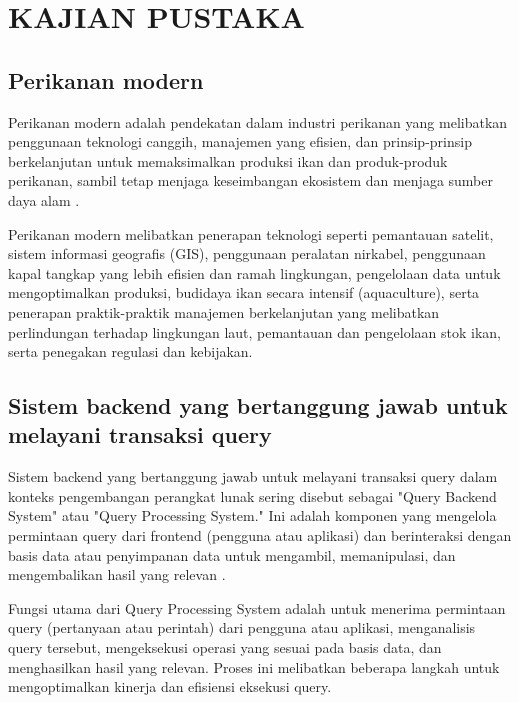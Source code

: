 
\chapter{KAJIAN PUSTAKA} 

\section{Perikanan modern}
Perikanan modern adalah pendekatan dalam industri perikanan yang melibatkan penggunaan teknologi canggih, manajemen yang efisien, dan prinsip-prinsip berkelanjutan untuk memaksimalkan produksi ikan dan produk-produk perikanan, sambil tetap menjaga keseimbangan ekosistem dan menjaga sumber daya alam \citep{kusuma2004sistem}.

Perikanan modern melibatkan penerapan teknologi seperti pemantauan satelit, sistem informasi geografis (GIS), penggunaan peralatan nirkabel, penggunaan kapal tangkap yang lebih efisien dan ramah lingkungan, pengelolaan data untuk mengoptimalkan produksi, budidaya ikan secara intensif (aquaculture), serta penerapan praktik-praktik manajemen berkelanjutan yang melibatkan perlindungan terhadap lingkungan laut, pemantauan dan pengelolaan stok ikan, serta penegakan regulasi dan kebijakan.

\section{Sistem backend yang bertanggung jawab untuk melayani transaksi query}

Sistem backend yang bertanggung jawab untuk melayani transaksi query dalam konteks pengembangan perangkat lunak sering disebut sebagai "Query Backend System" atau "Query Processing System." Ini adalah komponen yang mengelola permintaan query dari frontend (pengguna atau aplikasi) dan berinteraksi dengan basis data atau penyimpanan data untuk mengambil, memanipulasi, dan mengembalikan hasil yang relevan \citep{prayogi2021rancang}.

Fungsi utama dari Query Processing System adalah untuk menerima permintaan query (pertanyaan atau perintah) dari pengguna atau aplikasi, menganalisis query tersebut, mengeksekusi operasi yang sesuai pada basis data, dan menghasilkan hasil yang relevan. Proses ini melibatkan beberapa langkah untuk mengoptimalkan kinerja dan efisiensi eksekusi query.


